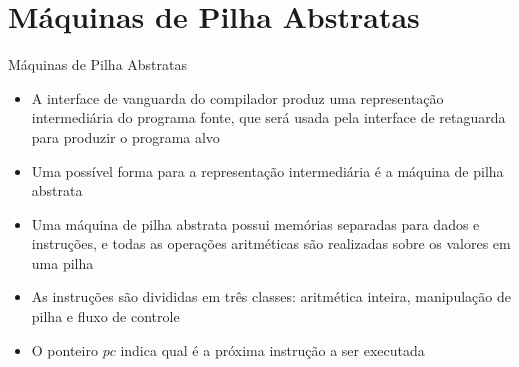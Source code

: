 \section{Máquinas de Pilha Abstratas}

\begin{frame}[fragile]{Máquinas de Pilha Abstratas}

    \begin{itemize}
        \item A interface de vanguarda do compilador produz uma representação intermediária do programa fonte, que será usada pela interface de retaguarda para
            produzir o programa alvo
        \pause

        \item Uma possível forma para a representação intermediária é a máquina de pilha abstrata
        \pause

        \item Uma máquina de pilha abstrata possui memórias separadas para dados e instruções, e todas as operações aritméticas são realizadas sobre os valores
            em uma pilha
        \pause

        \item As instruções são divididas em três classes: aritmética inteira, manipulação de pilha e fluxo de controle
        \pause

        \item O ponteiro $pc$ indica qual é a próxima instrução a ser executada
    \end{itemize}

\end{frame}


